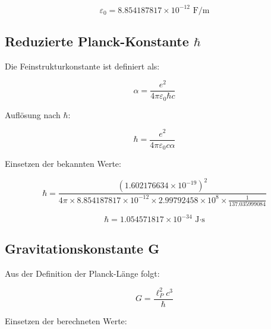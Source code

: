 	\begin{tcolorbox}[colback=green!5!white,colframe=green!75!black,title=Vakuum-Permittivität]
		\begin{equation}
			\boxed{\varepsilon_0 = 8.854187817 \times 10^{-12} \text{ F/m}}
		\end{equation}
	\end{tcolorbox}
	
	\subsection{Reduzierte Planck-Konstante $\hbar$}
	
	Die Feinstrukturkonstante ist definiert als:
	
	\begin{equation}
		\alpha = \frac{e^2}{4\pi\varepsilon_0\hbar c}
	\end{equation}
	
	Auflösung nach $\hbar$:
	
	\begin{equation}
		\hbar = \frac{e^2}{4\pi\varepsilon_0 c \alpha}
	\end{equation}
	
	Einsetzen der bekannten Werte:
	
	\begin{equation}
		\hbar = \frac{(1.602176634 \times 10^{-19})^2}{4\pi \times 8.854187817 \times 10^{-12} \times 2.99792458 \times 10^8 \times \frac{1}{137.035999084}}
	\end{equation}
	
	\begin{tcolorbox}[colback=green!5!white,colframe=green!75!black,title=Reduzierte Planck-Konstante]
		\begin{equation}
			\boxed{\hbar = 1.054571817 \times 10^{-34} \text{ J·s}}
		\end{equation}
	\end{tcolorbox}
	
	\subsection{Gravitationskonstante G}
	
	Aus der Definition der Planck-Länge folgt:
	
	\begin{equation}
		G = \frac{\ell_P^2 c^3}{\hbar}
	\end{equation}
	
	Einsetzen der berechneten Werte:
	
